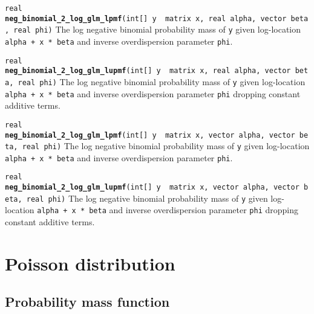 \documentclass[
  10pt,
]{book}
\begin{document}
\texttt{real} \textbf{\texttt{neg\_binomial\_2\_log\_glm\_lpmf}}\texttt{(int{[}{]}\ y\ \textbar{}\ matrix\ x,\ real\ alpha,\ vector\ beta,\ real\ phi)}\newline
The log negative binomial probability mass of \texttt{y} given log-location
\texttt{alpha\ +\ x\ *\ beta} and inverse overdispersion parameter \texttt{phi}.


\texttt{real} \textbf{\texttt{neg\_binomial\_2\_log\_glm\_lupmf}}\texttt{(int{[}{]}\ y\ \textbar{}\ matrix\ x,\ real\ alpha,\ vector\ beta,\ real\ phi)}\newline
The log negative binomial probability mass of \texttt{y} given log-location
\texttt{alpha\ +\ x\ *\ beta} and inverse overdispersion parameter \texttt{phi}
dropping constant additive terms.


\texttt{real} \textbf{\texttt{neg\_binomial\_2\_log\_glm\_lpmf}}\texttt{(int{[}{]}\ y\ \textbar{}\ matrix\ x,\ vector\ alpha,\ vector\ beta,\ real\ phi)}\newline
The log negative binomial probability mass of \texttt{y} given log-location
\texttt{alpha\ +\ x\ *\ beta} and inverse overdispersion parameter \texttt{phi}.


\texttt{real} \textbf{\texttt{neg\_binomial\_2\_log\_glm\_lupmf}}\texttt{(int{[}{]}\ y\ \textbar{}\ matrix\ x,\ vector\ alpha,\ vector\ beta,\ real\ phi)}\newline
The log negative binomial probability mass of \texttt{y} given log-location
\texttt{alpha\ +\ x\ *\ beta} and inverse overdispersion parameter \texttt{phi}
dropping constant additive terms.

\hypertarget{poisson}{%
\section{Poisson distribution}\label{poisson}}

\hypertarget{probability-mass-function-13}{%
\subsection{Probability mass function}\label{probability-mass-function-13}}
\end{document}
